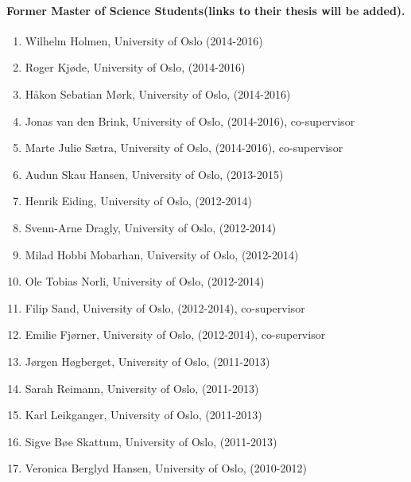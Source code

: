 \documentclass[%
oneside,                 %
final,                   %
10pt]{article}
\begin{document}
\paragraph{Former Master of Science Students(links to their thesis will be added).}
\begin{enumerate}
\item Wilhelm Holmen, University of Oslo (2014-2016)

\item Roger Kjøde, University of Oslo, (2014-2016)

\item Håkon Sebatian Mørk, University of Oslo, (2014-2016)

\item Jonas van den Brink, University of Oslo, (2014-2016), co-supervisor

\item Marte Julie Sætra, University of Oslo, (2014-2016), co-supervisor

\item Audun Skau Hansen, University of Oslo, (2013-2015)

\item Henrik Eiding, University of Oslo, (2012-2014)

\item Svenn-Arne Dragly, University of Oslo, (2012-2014)

\item Milad Hobbi Mobarhan, University of Oslo, (2012-2014)

\item Ole Tobias Norli, University of Oslo, (2012-2014)

\item Filip Sand, University of Oslo, (2012-2014), co-supervisor

\item Emilie Fjørner, University of Oslo, (2012-2014), co-supervisor

\item Jørgen Høgberget, University of Oslo, (2011-2013)

\item Sarah Reimann, University of Oslo, (2011-2013)

\item Karl Leikganger, University of Oslo, (2011-2013)

\item Sigve Bøe Skattum, University of Oslo, (2011-2013)

\item Veronica Berglyd Hansen, University of Oslo, (2010-2012)


\end{enumerate}
\end{document}
